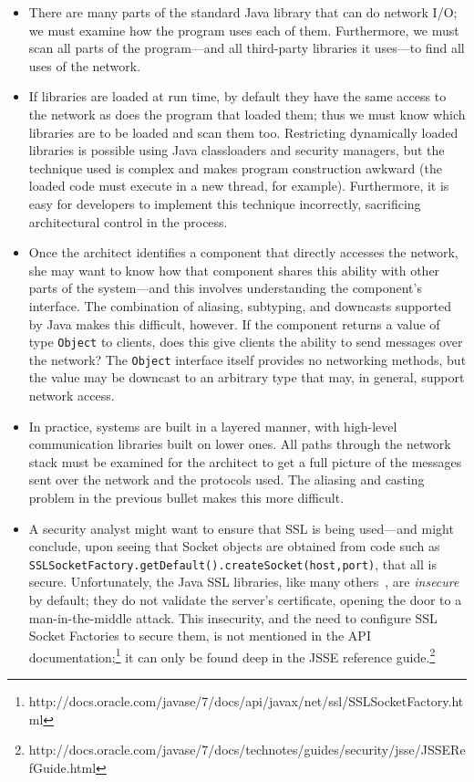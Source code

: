\documentclass[runningheads]{llncs}
\begin{document}
\begin{sloppypar}
\begin{itemize}

\item There are many parts of the standard Java library that can do network I/O; we must examine how the program uses each of them. Furthermore, we must scan all parts of the program---and all third-party libraries it uses---to find all uses of the network.

\item If libraries are loaded at run time, by default they have the same access to the network as does the program that loaded them; thus we must know which libraries are to be loaded and scan them too.  Restricting dynamically loaded libraries is possible using Java classloaders and security managers, but the technique used is complex and makes program construction awkward (the loaded code must execute in a new thread, for example).  Furthermore, it is easy for developers to implement this technique incorrectly, sacrificing architectural control in the process.

\item Once the architect identifies a component that directly accesses the network, she may want to know how that component shares this ability with other parts of the system---and this involves understanding the component's interface.  The combination of aliasing, subtyping, and downcasts supported by Java makes this difficult, however.  If the component returns a value of type \texttt{Object} to clients, does this give clients the ability to send messages over the network?  The \texttt{Object} interface itself provides no networking methods, but the value may be downcast to an arbitrary type that may, in general, support network access.

\item In practice, systems are built in a layered manner, with high-level communication libraries built on lower ones.  All paths through the network stack must be examined for the architect to get a full picture of the messages sent over the network and the protocols used.  The aliasing and casting problem in the previous bullet makes this more difficult.

\item A security analyst might want to ensure that SSL is being used---and might conclude, upon seeing that Socket objects are obtained from code such as \texttt{SSLSocketFactory.getDefault().createSocket(host,port)}, that all is secure.  Unfortunately, the Java SSL libraries, like many others~\cite{most-dangerous-code-in-the-world}, are \emph{insecure} by default; they do not validate the server's certificate, opening the door to a man-in-the-middle attack.  This insecurity, and the need to configure SSL Socket Factories to secure them, is not mentioned in the API documentation;\footnote{http://docs.oracle.com/javase/7/docs/api/javax/net/ssl/SSLSocketFactory.html} it can only be found deep in the JSSE reference guide.\footnote{http://docs.oracle.com/javase/7/docs/technotes/guides/security/jsse/JSSERefGuide.html}


\end{itemize}
\end{sloppypar}
\end{document}
